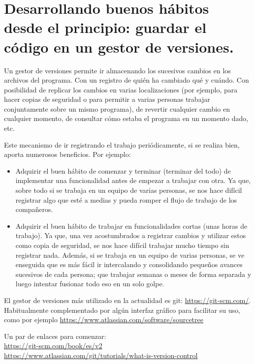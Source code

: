 \documentclass[spanish,12pt,a4paper,final,oneside]{book}
\begin{document}
\chapter{Desarrollando buenos hábitos desde el principio: guardar el código en un gestor de versiones.}

Un gestor de versiones permite ir almacenando los sucesivos cambios en los archivos del programa. Con un registro de quién ha cambiado qué y cuándo. Con posibilidad de replicar los cambios en varias localizaciones (por ejemplo, para hacer copias de seguridad o para permitir a varias personas trabajar conjuntamente sobre un mismo programa), de revertir cualquier cambio en cualquier momento, de consultar cómo estaba el programa en un momento dado, etc.

Este mecanismo de ir registrando el trabajo periódicamente, si se realiza bien, aporta numerosos beneficios. Por ejemplo:
\begin{itemize}
\item Adquirir el buen hábito de comenzar y terminar (terminar del todo) de implementar una funcionalidad antes de empezar a trabajar con otra. Ya que, sobre todo si se trabaja en un equipo de varias personas, se nos hace difícil registrar algo que esté a medias y pueda romper el flujo de trabajo de los compañeros.
\item Adquirir el buen hábito de trabajar en funcionalidades cortas (unas horas de trabajo). Ya que, una vez acostumbrados a registrar cambios y utilizar estos como copia de seguridad, se nos hace difícil trabajar mucho tiempo sin registrar nada. Además, si se trabaja en un equipo de varias personas,  se ve enseguida que es más fácil ir intercalando y consolidando pequeños avances sucesivos de cada persona; que trabajar semanas o meses de forma separada y luego intentar fusionar todo eso en un solo golpe.
\end{itemize}

El gestor de versiones más utilizado en la actualidad es git: \url{https://git-scm.com/}.
\\ Habitualmente complementado por algún interfaz gráfico para facilitar su uso, como por ejemplo {\small \url{https://www.atlassian.com/software/sourcetree}}

Un par de enlaces para comenzar:
\\ \url{https://git-scm.com/book/es/v2}
\\ \url{https://www.atlassian.com/git/tutorials/what-is-version-control}
\end{document}
